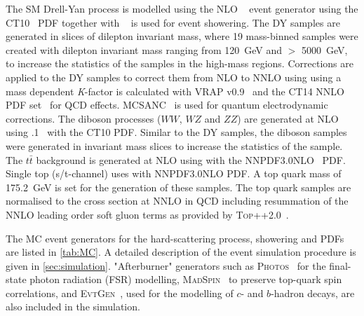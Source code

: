 The SM Drell-Yan process is modelled using the NLO \POWHEGBOX~\cite{Alioli:2010xd,Frixione:2007vw} event generator using the CT10~\cite{ct10} PDF together with ~\cite{pythia8} is used for event showering. The DY samples are generated in slices of dilepton invariant mass, where 19 mass-binned samples were created with dilepton invariant mass ranging from \SI{120}{\giga\electronvolt} and $>$ \SI{5000}{\giga\electronvolt}, to increase the statistics of the samples in the high-mass regions. Corrections are applied to the DY samples to correct them from NLO to NNLO using using a mass dependent \emph{K}-factor is calculated with {\textsc{VRAP}} v0.9~\cite{vrap} and the CT14 NNLO PDF set~\cite{CT14} for QCD effects. {\textsc{MCSANC}}~\cite{MCSANC} is used for quantum electrodynamic corrections.  The diboson processes ($WW$, $WZ$ and $ZZ$) are generated at NLO using .1~\cite{Gleisberg:2008ta} with the CT10 PDF. Similar to the DY samples, the diboson samples were generated in invariant mass slices to increase the statistics of the sample. The $t\bar{t}$ background is generated at NLO using \POWHEGBOX with the NNPDF3.0NLO~\cite{Ball:2014uwa} PDF. Single top (s/t-channel) uses \POWHEGBOX with NNPDF3.0NLO PDF. A top quark mass of \SI{175.2}{\giga\electronvolt} is set for the generation of these samples. The top quark samples are normalised to the cross section at NNLO in QCD including resummation of the NNLO leading order soft gluon terms as provided by \textsc{Top++}2.0~\cite{Czakon:2011xx}.

The MC event generators for the hard-scattering process, showering and PDFs are listed in \cref{tab:MC}. A detailed description of the event simulation procedure is given in \cref{sec:simulation}. "Afterburner" generators such as \textsc{Photos}~\cite{Golonka:2005pn} for the final-state photon radiation (FSR) modelling, \textsc{MadSpin}~\cite{Artoisenet:2012st} to preserve top-quark spin correlations, and \textsc{EvtGen}~\cite{Lange:2001uf}, used for the modelling of $c$- and $b$-hadron decays, are also included in the simulation.

